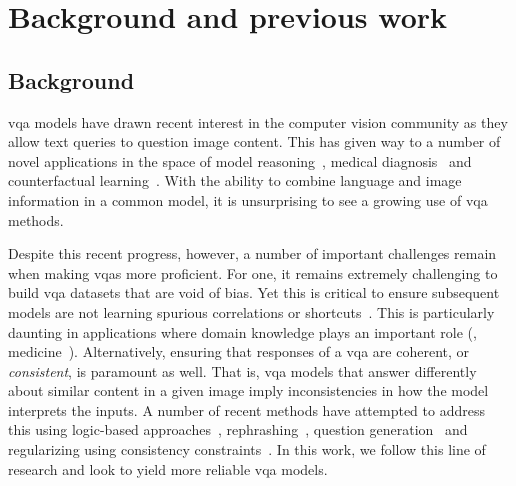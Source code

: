 \section{Background and previous work}

\subsection{Background}
\gls{vqa} models have drawn recent interest in the computer vision community as they allow text queries to question image content. This has given way to a number of novel applications in the space of model reasoning~\cite{wang2015explicit,cadene2019murel,wu2021multi,jing2022maintaining}, medical diagnosis~\cite{nguyen2019overcoming,vu2020question,gupta2021hierarchical,zhan2020medical} and counterfactual learning~\cite{agarwal2020towards,chen2020counterfactual,abbasnejad2020counterfactual}. With the ability to combine language and image information in a common model, it is unsurprising to see a growing use of \gls{vqa} methods.

Despite this recent progress, however, a number of important challenges remain when making \gls{vqa}s more proficient. For one, it remains extremely challenging to build \gls{vqa} datasets that are void of bias. Yet this is critical to ensure subsequent models are not learning spurious correlations or shortcuts~\cite{teney2020unshuffling}. This is particularly daunting in applications where domain knowledge plays an important role (\eg,  medicine~\cite{he2020pathvqa,lau2018dataset,do2021multiple}). Alternatively, ensuring that responses of a \gls{vqa} are coherent, or {\it consistent}, is paramount as well. That is, \gls{vqa} models that answer differently about similar content in a given image imply inconsistencies in how the model interprets the inputs. A number of recent methods have attempted to address this using logic-based approaches~\cite{gokhale2020vqa}, rephrashing~\cite{shah2019cycle}, question generation~\cite{ribeiro2019red,ray2019sunny, goel2021iq} and regularizing using consistency constraints~\cite{tascon2022consistency}. In this work, we follow this line of research and look to yield more reliable \gls{vqa} models.

